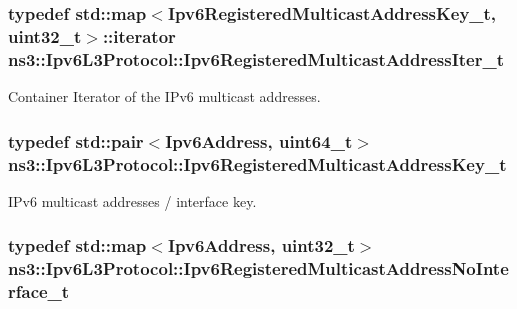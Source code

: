 \subsubsection[{\texorpdfstring{Ipv6\+Registered\+Multicast\+Address\+Iter\+\_\+t}{Ipv6RegisteredMulticastAddressIter_t}}]{\setlength{\rightskip}{0pt plus 5cm}typedef std\+::map$<${\bf Ipv6\+Registered\+Multicast\+Address\+Key\+\_\+t}, uint32\+\_\+t$>$\+::iterator {\bf ns3\+::\+Ipv6\+L3\+Protocol\+::\+Ipv6\+Registered\+Multicast\+Address\+Iter\+\_\+t}\hspace{0.3cm}{\ttfamily [private]}}\hypertarget{classns3_1_1Ipv6L3Protocol_aaa04da26fa5428e033aae963d54185fd}{}\label{classns3_1_1Ipv6L3Protocol_aaa04da26fa5428e033aae963d54185fd}


Container Iterator of the I\+Pv6 multicast addresses. 

\subsubsection[{\texorpdfstring{Ipv6\+Registered\+Multicast\+Address\+Key\+\_\+t}{Ipv6RegisteredMulticastAddressKey_t}}]{\setlength{\rightskip}{0pt plus 5cm}typedef std\+::pair$<${\bf Ipv6\+Address}, uint64\+\_\+t$>$ {\bf ns3\+::\+Ipv6\+L3\+Protocol\+::\+Ipv6\+Registered\+Multicast\+Address\+Key\+\_\+t}\hspace{0.3cm}{\ttfamily [private]}}\hypertarget{classns3_1_1Ipv6L3Protocol_ad85035c0604805049efdc7a5b3d99082}{}\label{classns3_1_1Ipv6L3Protocol_ad85035c0604805049efdc7a5b3d99082}


I\+Pv6 multicast addresses / interface key. 

\subsubsection[{\texorpdfstring{Ipv6\+Registered\+Multicast\+Address\+No\+Interface\+\_\+t}{Ipv6RegisteredMulticastAddressNoInterface_t}}]{\setlength{\rightskip}{0pt plus 5cm}typedef std\+::map$<${\bf Ipv6\+Address}, uint32\+\_\+t$>$ {\bf ns3\+::\+Ipv6\+L3\+Protocol\+::\+Ipv6\+Registered\+Multicast\+Address\+No\+Interface\+\_\+t}\hspace{0.3cm}{\ttfamily [private]}}\hypertarget{classns3_1_1Ipv6L3Protocol_a21d330eef03b790c7ff3330abfa738fa}{}\label{classns3_1_1Ipv6L3Protocol_a21d330eef03b790c7ff3330abfa738fa}


